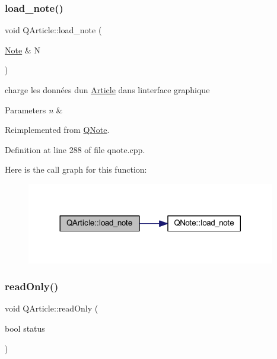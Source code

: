 \subsubsection{\texorpdfstring{load\+\_\+note()}{load\_note()}}
{\footnotesize\ttfamily void Q\+Article\+::load\+\_\+note (\begin{DoxyParamCaption}\item[{\hyperlink{class_note}{Note} \&}]{N }\end{DoxyParamCaption})\hspace{0.3cm}{\ttfamily [virtual]}}



charge les données d\textquotesingle{}un \hyperlink{class_article}{Article} dans l\textquotesingle{}interface graphique 


\begin{DoxyParams}{Parameters}
{\em n} & \\
\hline
\end{DoxyParams}


Reimplemented from \hyperlink{class_q_note_adca0a8f2851fbb1c3843ca4fe7957c11}{Q\+Note}.



Definition at line 288 of file qnote.\+cpp.

Here is the call graph for this function\+:\nopagebreak
\begin{figure}[H]
\begin{center}
\leavevmode
\includegraphics[width=308pt]{class_q_article_aea21c10581abe74709317283739e9552_cgraph}
\end{center}
\end{figure}
\mbox{\label{class_q_article_af6c14f4ce3df750a0e1a22207309068e}} 
\subsubsection{\texorpdfstring{read\+Only()}{readOnly()}}
{\footnotesize\ttfamily void Q\+Article\+::read\+Only (\begin{DoxyParamCaption}\item[{bool}]{status }\end{DoxyParamCaption})\hspace{0.3cm}{\ttfamily [virtual]}}



